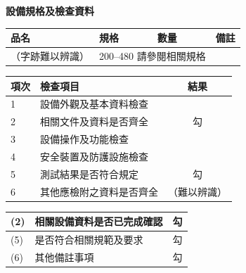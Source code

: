 \documentclass[UTF8,10pt,a4paper,fontset=fandol]{ctexart}
\newcommand{\fieldvalue}[1]{#1}
\newcommand{\handwritten}[1]{#1}
\begin{document}

\newpage

\begin{center}
\textbf{設備規格及檢查資料}
\end{center}

\begin{tabularx}{\textwidth}{|l|X|l|l|}
\hline
品名 & 規格 & 數量 & 備註 \\
\hline
\fieldvalue{\handwritten{（字跡難以辨識）}} &
\multicolumn{2}{l|}{200--480 請參閱相關規格} \\
\hline
\end{tabularx}

\vspace{1em}

\begin{tabularx}{\textwidth}{|l|X|c|}
\hline
項次 & 檢查項目 & 結果 \\
\hline
1 & 設備外觀及基本資料檢查 & \\
\hline
2 & 相關文件及資料是否齊全 & 
\fieldvalue{\handwritten{勾}} \\
\hline
3 & 設備操作及功能檢查 & \\
\hline
4 & 安全裝置及防護設施檢查 & \\
\hline
5 & 測試結果是否符合規定 & 
\fieldvalue{\handwritten{勾}} \\
\hline
6 & 其他應檢附之資料是否齊全 & 
\fieldvalue{\handwritten{（難以辨識）}} \\
\hline
\end{tabularx}

\vspace{1em}

\begin{tabularx}{\textwidth}{|l|X|c|}
\hline
(2) & 相關設備資料是否已完成確認 & 
\fieldvalue{\handwritten{勾}} \\
\hline
(5) & 是否符合相關規範及要求 & 
\fieldvalue{\handwritten{勾}} \\
\hline
(6) & 其他備註事項 & 
\fieldvalue{\handwritten{勾}} \\
\hline
\end{tabularx}
\end{document}
